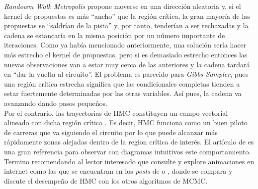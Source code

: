 \textit{Randowm Walk Metropolis} propone moverse en una dirección aleatoria y, si el kernel de propuestas es más ``ancho'' que la región crítica, la gran mayoría de las propuestas se ``saldrían de la pista'' y, por tanto, tenderían a ser rechazadas y la cadena se estancaría en la misma posición por un número importante de iteraciones. Como ya había mencionado anteriormente, una solución sería hacer más estrecho el kernel de propuestas, pero si es demasiado estrecho entonces las nuevas observaciones van a estar muy cerca de las anteriores y la cadena tardará en ``dar la vuelta al circuito''. El problema es parecido para \textit{Gibbs Sampler}, pues una región crítica estrecha significa que las condicionales completas tienden a estar fuertemente determinadas por las otras variables. Así pues, la cadena va avanzando dando pasos pequeños.\\ 

Por el contrario, las trayectorias de HMC constituyen un campo vectorial alineado con dicha región crítica \parencite{Betancourt17}. Es decir, HMC funciona como un buen piloto de carreras que va siguiendo el circuito por lo que puede alcanzar más rápidamente zonas alejadas dentro de la region crítica de interés. El artículo de \textcite{Betancourt17} es una gran referencia para observar con diagramas intuitivos este comportamiento. Termino recomendando al lector interesado que consulte y explore animaciones en internet como las que se encuentran en los \textit{posts} de \textcite{McElreath17} o \textcite{Rogozhnikov16}, donde se compara y discute el desempeño de HMC con los otros algoritmos de MCMC. 
